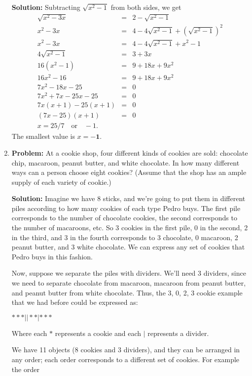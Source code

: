 \documentclass{article}
\begin{document}
\begin{enumerate}
\textbf{Solution:}
Subtracting $\sqrt{x^2 - 1}$ from both sides, we get \\
\begin{eqnarray*}
\sqrt{x^2 - 3x} &=& 2 - \sqrt{x^2 - 1} \\
x^2 - 3x &=& 4 - 4\sqrt{x^2 - 1} + (\sqrt{x^2 - 1})^2 \\
x^2 - 3x &=& 4 - 4\sqrt{x^2 - 1} + x^2 - 1 \\
4\sqrt{x^2 - 1} &=& 3 + 3x \\
16(x^2 - 1) &=& 9 + 18x + 9x^2 \\
16x^2 - 16 &=& 9 + 18x + 9x^2 \\
7x^2 - 18x - 25 &=& 0 \\
7x^2 + 7x - 25x - 25 &=& 0 \\
7x(x+1) - 25(x+1) &=& 0 \\
(7x-25)(x+1) &=& 0 \\
x = 25/7 \quad \textrm{or} \quad -1.
\end{eqnarray*}
The smallest value is $x = \mathbf{-1}$.

\item \textbf{Problem:} At a cookie shop, four different kinds of cookies are sold: chocolate chip, macaroon, peanut butter, and white chocolate.  In how many different ways can a person choose eight cookies?  (Assume that the shop has an ample supply of each variety of cookie.)

\textbf{Solution:} Imagine we have 8 sticks, and we're going to put them in different piles according to how many cookies of each type Pedro buys.  The first pile corresponds to the number of chocolate cookies, the second corresponds to the number of macaroons, etc.  So 3 cookies in the first pile, 0 in the second, 2 in the third, and 3 in the fourth corresponds to 3 chocolate, 0 macaroon, 2 peanut butter, and 3 white chocolate.  We can express any set of cookies that Pedro buys in this fashion.

Now, suppose we separate the piles with dividers.  We'll need 3 dividers, since we need to separate chocolate from macaroon, macaroon from peanut butter, and peanut butter from white chocolate.  Thus, the 3, 0, 2, 3 cookie example that we had before could be expressed as:

$* * * | | * * | * * *$

Where each $*$ represents a cookie and each $|$ represents a divider.

We have 11 objects (8 cookies and 3 dividers), and they can be arranged in any order; each order corresponds to a different set of cookies.  For example the order


\end{enumerate}
\end{document}
